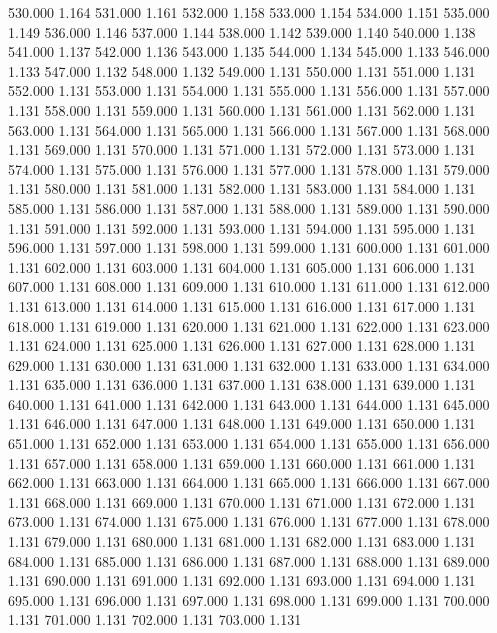 530.000 1.164 
531.000 1.161 
532.000 1.158 
533.000 1.154 
534.000 1.151 
535.000 1.149 
536.000 1.146 
537.000 1.144 
538.000 1.142 
539.000 1.140 
540.000 1.138 
541.000 1.137 
542.000 1.136 
543.000 1.135 
544.000 1.134 
545.000 1.133 
546.000 1.133 
547.000 1.132 
548.000 1.132 
549.000 1.131 
550.000 1.131 
551.000 1.131 
552.000 1.131 
553.000 1.131 
554.000 1.131 
555.000 1.131 
556.000 1.131 
557.000 1.131 
558.000 1.131 
559.000 1.131 
560.000 1.131 
561.000 1.131 
562.000 1.131 
563.000 1.131 
564.000 1.131 
565.000 1.131 
566.000 1.131 
567.000 1.131 
568.000 1.131 
569.000 1.131 
570.000 1.131 
571.000 1.131 
572.000 1.131 
573.000 1.131 
574.000 1.131 
575.000 1.131 
576.000 1.131 
577.000 1.131 
578.000 1.131 
579.000 1.131 
580.000 1.131 
581.000 1.131 
582.000 1.131 
583.000 1.131 
584.000 1.131 
585.000 1.131 
586.000 1.131 
587.000 1.131 
588.000 1.131 
589.000 1.131 
590.000 1.131 
591.000 1.131 
592.000 1.131 
593.000 1.131 
594.000 1.131 
595.000 1.131 
596.000 1.131 
597.000 1.131 
598.000 1.131 
599.000 1.131 
600.000 1.131 
601.000 1.131 
602.000 1.131 
603.000 1.131 
604.000 1.131 
605.000 1.131 
606.000 1.131 
607.000 1.131 
608.000 1.131 
609.000 1.131 
610.000 1.131 
611.000 1.131 
612.000 1.131 
613.000 1.131 
614.000 1.131 
615.000 1.131 
616.000 1.131 
617.000 1.131 
618.000 1.131 
619.000 1.131 
620.000 1.131 
621.000 1.131 
622.000 1.131 
623.000 1.131 
624.000 1.131 
625.000 1.131 
626.000 1.131 
627.000 1.131 
628.000 1.131 
629.000 1.131 
630.000 1.131 
631.000 1.131 
632.000 1.131 
633.000 1.131 
634.000 1.131 
635.000 1.131 
636.000 1.131 
637.000 1.131 
638.000 1.131 
639.000 1.131 
640.000 1.131 
641.000 1.131 
642.000 1.131 
643.000 1.131 
644.000 1.131 
645.000 1.131 
646.000 1.131 
647.000 1.131 
648.000 1.131 
649.000 1.131 
650.000 1.131 
651.000 1.131 
652.000 1.131 
653.000 1.131 
654.000 1.131 
655.000 1.131 
656.000 1.131 
657.000 1.131 
658.000 1.131 
659.000 1.131 
660.000 1.131 
661.000 1.131 
662.000 1.131 
663.000 1.131 
664.000 1.131 
665.000 1.131 
666.000 1.131 
667.000 1.131 
668.000 1.131 
669.000 1.131 
670.000 1.131 
671.000 1.131 
672.000 1.131 
673.000 1.131 
674.000 1.131 
675.000 1.131 
676.000 1.131 
677.000 1.131 
678.000 1.131 
679.000 1.131 
680.000 1.131 
681.000 1.131 
682.000 1.131 
683.000 1.131 
684.000 1.131 
685.000 1.131 
686.000 1.131 
687.000 1.131 
688.000 1.131 
689.000 1.131 
690.000 1.131 
691.000 1.131 
692.000 1.131 
693.000 1.131 
694.000 1.131 
695.000 1.131 
696.000 1.131 
697.000 1.131 
698.000 1.131 
699.000 1.131 
700.000 1.131 
701.000 1.131 
702.000 1.131 
703.000 1.131 
